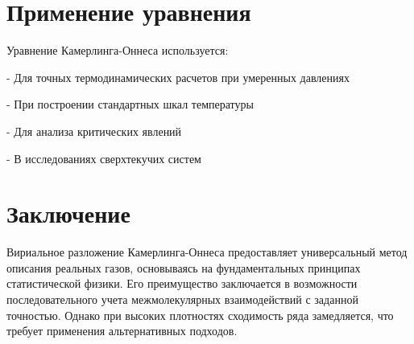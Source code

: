\documentclass[12pt]{article}
\begin{document}
\section{Применение уравнения}
Уравнение Камерлинга-Оннеса используется:

    
- Для точных термодинамических расчетов при умеренных давлениях
    
- При построении стандартных шкал температуры
    
- Для анализа критических явлений
    
- В исследованиях сверхтекучих систем


\section*{Заключение}
Вириальное разложение Камерлинга-Оннеса предоставляет универсальный метод описания реальных газов, основываясь на фундаментальных принципах статистической физики. Его преимущество заключается в возможности последовательного учета межмолекулярных взаимодействий с заданной точностью. Однако при высоких плотностях сходимость ряда замедляется, что требует применения альтернативных подходов.
\end{document}
